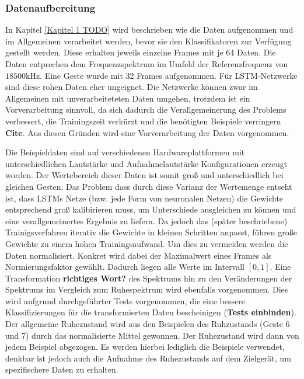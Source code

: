 \subsubsection{Datenaufbereitung}
\label{sec:lstm_data}

In Kapitel \ref{Kapitel 1 TODO} wird beschrieben wie die Daten aufgenommen und
im Allgemeinen verarbeitet werden, bevor sie den Klassifikatoren zur
Verfügung gestellt werden. Diese erhalten jeweils einzelne Frames mit je 64
Daten. Die Daten entprechen dem Frequenzspektrum im Umfeld der
Referenzfrequenz von $18500\text{kHz}$. Eine Geste wurde mit 32 Frames
aufgenommen. Für \ac{LSTM}-Netzwerke sind diese rohen Daten eher ungeignet. Die
Netzwerke können zwar im Allgemeinen mit unverarbeiteteten Daten umgehen,
trotzdem ist ein Vorverarbeitung sinnvoll, da sich dadurch die Verallgemeinerung
des Problems verbessert, die Trainingszeit verkürzt und die benötigten Beispiele
verringern \textbf{Cite}. Aus diesen Gründen wird eine Vorverarbeitung der Daten
vorgenommen. 

Die Beispieldaten sind auf verschiedenen Hardwareplattformen mit
unterschiedlichen Lautstärke und Aufnahmelautstärke Konfigurationen erzeugt
worden. Der Wertebereich dieser Daten ist somit groß und unterschiedlich bei
gleichen Gesten. Das Problem dass durch diese Varianz der Wertemenge entseht
ist, dass \acp{LSTM} Netze (bzw. jede Form von neuronalen Netzen) die Gewichte
entsprechend groß kalibirieren muss, um Unterschiede ausgleichen zu können und
eine verallgemeinertes Ergebnis zu liefern. Da jedoch das (später beschriebene)
Trainigsverfahren iterativ die Gewichte in kleinen Schritten anpasst, führen
große Gewichte zu einem hohen Trainingsaufwand. Um dies zu vermeiden werden die
Daten normalisiert. Konkret wird dabei der Maximalwert eines Frames als
Normierungsfaktor gewählt. Dadurch liegen alle Werte im Intervall $[0,1]$.
Eine Transformation \textbf{richtiges Wort?} des Spektrums hin zu den
Veränderungen der Spektrums im Vergleich zum Ruhespektrum wird ebenfalls
vorgenommen. Dies wird aufgrund durchgeführter Tests vorgenommen, die eine
bessere Klassifizierungen für die transformierten Daten bescheinigen
(\textbf{Tests einbinden}). Der allgemeine Ruhezustand wird aus den Beispielen
des Ruhzustands (Geste 6 und 7) durch das normalisierte Mittel gewonnen. Der
Ruhezustand wird dann von jedem Beispiel abgezogen. Es werden hierbei lediglich
die Beispiele verwendet, denkbar ist jedoch auch die Aufnahme des Ruhezustands
auf dem Zielgerät, um spezifischere Daten zu erhalten. 

